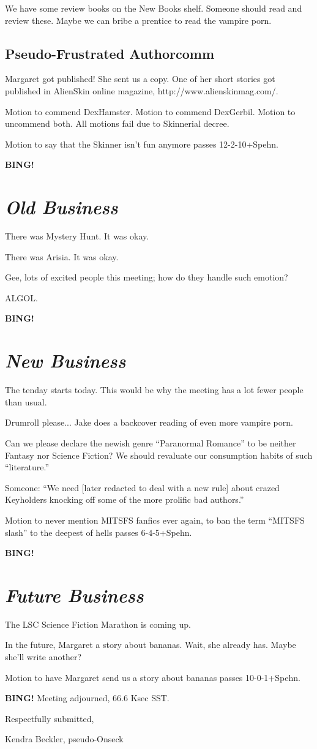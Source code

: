 \documentclass[10pt]{article}
\newcommand{\bing}{{\bf BING!} }
\newcommand{\goto}[1]{\bing \vskip 12pt \section*{{\em{#1}}}}
\begin{document}
We have some review books on the New Books shelf.  Someone should read and review these.  Maybe we can bribe a prentice to read the vampire porn.

\subsection*{Pseudo-Frustrated Authorcomm}

Margaret got published!  She sent us a copy.  One of her short stories got published in AlienSkin online magazine, http://www.alienskinmag.com/.

Motion to commend DexHamster.  Motion to commend DexGerbil.  Motion to uncommend both.  All motions fail due to Skinnerial decree.

Motion to say that the Skinner isn't fun anymore passes 12-2-10+Spehn.

\goto{Old Business}

There was Mystery Hunt.  It was okay.

There was Arisia.  It was okay.

Gee, lots of excited people this meeting; how do they handle such emotion?

ALGOL.

\goto{New Business}

The tenday starts today.  This would be why the meeting has a lot fewer people than usual.

Drumroll please... Jake does a backcover reading of even more vampire porn.

Can we please declare the newish genre ``Paranormal Romance'' to be neither Fantasy nor Science Fiction?  We should revaluate our consumption habits of such ``literature.''

Someone: ``We need [later redacted to deal with a new rule]  about crazed Keyholders knocking off some of the more prolific bad authors.''

Motion to never mention MITSFS fanfics ever again, to ban the term ``MITSFS slash'' to the deepest of hells passes 6-4-5+Spehn.

\goto{Future Business}

The LSC Science Fiction Marathon is coming up.

In the future, Margaret a story about bananas.  Wait, she already has.  Maybe she'll write another?

Motion to have Margaret send us a story about bananas passes 10-0-1+Spehn.

\bing
\noindent
Meeting adjourned, 66.6 Ksec SST.

\vspace{18pt}

\centerline{Respectfully submitted,}
\centerline{Kendra Beckler, pseudo-Onseck}
\end{document}
